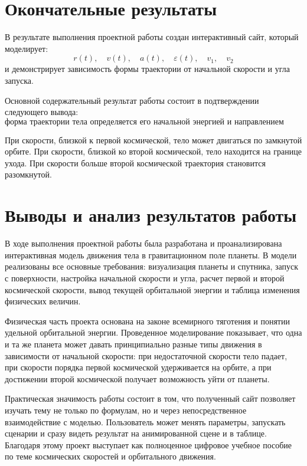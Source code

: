 \documentclass[12pt,a4paper]{article}
\begin{document}
\section{Окончательные результаты}
В результате выполнения проектной работы создан интерактивный сайт, который моделирует:
\[
r(t),\quad v(t),\quad a(t),\quad \varepsilon(t),\quad v_1,\quad v_2
\]
и демонстрирует зависимость формы траектории от начальной скорости и угла запуска.

Основной содержательный результат работы состоит в подтверждении следующего вывода:
\[
\text{форма траектории тела определяется его начальной энергией и направлением скорости.}
\]

При скорости, близкой к первой космической, тело может двигаться по замкнутой орбите. При скорости, близкой ко второй космической, тело находится на границе ухода. При скорости больше второй космической траектория становится разомкнутой.

\section{Выводы и анализ результатов работы}
В ходе выполнения проектной работы была разработана и проанализирована интерактивная модель движения тела в гравитационном поле планеты. В модели реализованы все основные требования: визуализация планеты и спутника, запуск с поверхности, настройка начальной скорости и угла, расчет первой и второй космической скорости, вывод текущей орбитальной энергии и таблица изменения физических величин.

Физическая часть проекта основана на законе всемирного тяготения и понятии удельной орбитальной энергии. Проведенное моделирование показывает, что одна и та же планета может давать принципиально разные типы движения в зависимости от начальной скорости: при недостаточной скорости тело падает, при скорости порядка первой космической удерживается на орбите, а при достижении второй космической получает возможность уйти от планеты.

Практическая значимость работы состоит в том, что полученный сайт позволяет изучать тему не только по формулам, но и через непосредственное взаимодействие с моделью. Пользователь может менять параметры, запускать сценарии и сразу видеть результат на анимированной сцене и в таблице. Благодаря этому проект выступает как полноценное цифровое учебное пособие по теме космических скоростей и орбитального движения.
\end{document}
